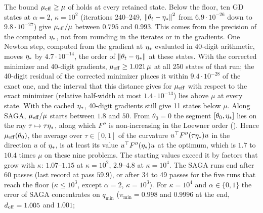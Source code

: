 The bound $\mu_{\mathrm{eff}}\ge\mu$ of  holds at every retained state. Below the floor, ten GD states at
$\alpha=2$, $\kappa=10^2$ (iterations 240--249, $\left\|\theta_t-\eta_\ast\right\|^2$ from $6.9\cdot10^{-26}$ down to
$9.8\cdot10^{-27}$) give $\mu_{\mathrm{eff}}/\mu$ between $0.795$ and $0.993$. This comes from the precision of the computed $\eta_\ast$,
not from rounding in the iterates or in the gradients. One Newton step, computed from the gradient at $\eta_\ast$ evaluated
in 40-digit arithmetic, moves $\eta_\ast$ by $4.7\cdot10^{-14}$, the order of $\left\|\theta_t-\eta_\ast\right\|$ at these states.
With the corrected minimizer and 40-digit gradients, $\mu_{\mathrm{eff}}\ge1.021\,\mu$ at all 250 states of that run; the 40-digit
residual of the corrected minimizer places it within $9.4\cdot10^{-28}$ of the exact one, and the interval that this
distance gives for $\mu_{\mathrm{eff}}$ with respect to the exact minimizer (relative half-width at most $1.4\cdot10^{-13}$) lies
above $\mu$ at every state. With the cached $\eta_\ast$, 40-digit gradients still give 11 states below $\mu$. Along SAGA,
$\mu_{\mathrm{eff}}/\mu$ starts between $1.8$ and $50$. From $\theta_0=0$ the segment $[\theta_0,\eta_\ast]$ lies on the ray
$\tau\mapsto\tau\eta_\ast$, along which $F''$ is non-increasing in the Loewner order (). Hence
$\mu_{\mathrm{eff}}(\theta_0)$, the average over $\tau\in[0,1]$ of the curvature $u^\top F''(\tau\eta_\ast)u$ in the direction $u$ of
$\eta_\ast$, is at least its value $u^\top F''(\eta_\ast)u$ at the optimum, which is $1.7$ to $10.4$ times $\mu$ on these
nine problems. The starting values exceed it by factors that grow with $\kappa$: $1.07$--$1.15$ at $\kappa=10^2$,
$2.9$--$4.8$ at $\kappa=10^4$. The SAGA runs end after 60 passes (last record at pass $59.9$), or after 34 to 49 passes for the five runs
that reach the floor ($\kappa\le10^3$, except $\alpha=2$, $\kappa=10^3$). For $\kappa=10^4$ and $\alpha\in\{0,1\}$ the
error of SAGA concentrates on $q_{\min}$ ($\pi_{\min}=0.998$ and $0.9996$ at the end, $d_{\rm eff}=1.005$ and $1.001$;
